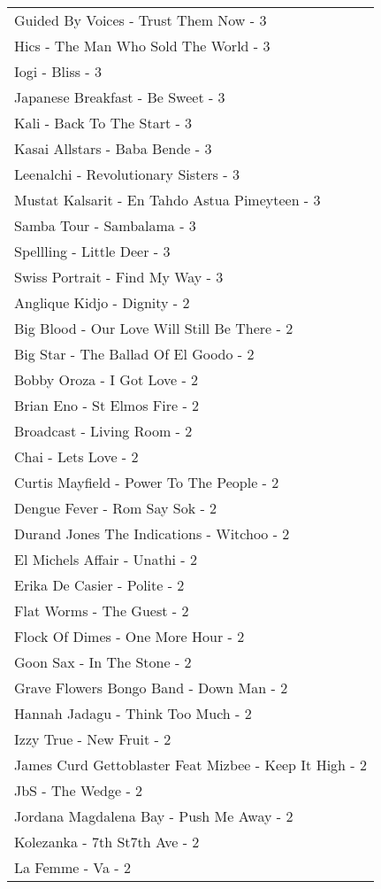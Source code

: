\documentclass[
]{article}
\begin{document}
\begin{longtable}{l}
Guided By Voices - Trust Them Now - 3 \\ 
Hics - The Man Who Sold The World - 3 \\ 
Iogi - Bliss - 3 \\ 
Japanese Breakfast - Be Sweet - 3 \\ 
Kali - Back To The Start - 3 \\ 
Kasai Allstars - Baba Bende - 3 \\ 
Leenalchi - Revolutionary Sisters - 3 \\ 
Mustat Kalsarit - En Tahdo Astua Pimeyteen - 3 \\ 
Samba Tour - Sambalama - 3 \\ 
Spellling - Little Deer - 3 \\ 
Swiss Portrait - Find My Way - 3 \\ 
Anglique Kidjo - Dignity - 2 \\ 
Big Blood - Our Love Will Still Be There - 2 \\ 
Big Star - The Ballad Of El Goodo - 2 \\ 
Bobby Oroza - I Got Love - 2 \\ 
Brian Eno - St Elmos Fire - 2 \\ 
Broadcast - Living Room - 2 \\ 
Chai - Lets Love - 2 \\ 
Curtis Mayfield - Power To The People - 2 \\ 
Dengue Fever - Rom Say Sok - 2 \\ 
Durand Jones The Indications - Witchoo - 2 \\ 
El Michels Affair - Unathi - 2 \\ 
Erika De Casier - Polite - 2 \\ 
Flat Worms - The Guest - 2 \\ 
Flock Of Dimes - One More Hour - 2 \\ 
Goon Sax - In The Stone - 2 \\ 
Grave Flowers Bongo Band - Down Man - 2 \\ 
Hannah Jadagu - Think Too Much - 2 \\ 
Izzy True - New Fruit - 2 \\ 
James Curd Gettoblaster Feat Mizbee - Keep It High - 2 \\ 
JbS - The Wedge - 2 \\ 
Jordana Magdalena Bay - Push Me Away - 2 \\ 
Kolezanka - 7th St7th Ave - 2 \\ 
La Femme - Va - 2 \\ 

\end{longtable}
\end{document}
